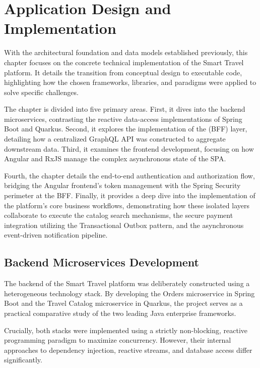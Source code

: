\chapter{Application Design and Implementation}
\label{sec:implementation}

With the architectural foundation and data models established previously, this chapter focuses on the concrete technical implementation of the Smart Travel platform. It details the transition from conceptual design to executable code, highlighting how the chosen frameworks, libraries, and paradigms were applied to solve specific challenges.

The chapter is divided into five primary areas. First, it dives into the backend microservices, contrasting the reactive data-access implementations of Spring Boot and Quarkus. Second, it explores the implementation of the (\gls{BFF}) layer, detailing how a centralized GraphQL API was constructed to aggregate downstream data. Third, it examines the frontend development, focusing on how Angular and RxJS manage the complex asynchronous state of the SPA.

Fourth, the chapter details the end-to-end authentication and authorization flow, bridging the Angular frontend's token management with the Spring Security perimeter at the BFF. Finally, it provides a deep dive into the implementation of the platform's core business workflows, demonstrating how these isolated layers collaborate to execute the catalog search mechanisms, the secure payment integration utilizing the Transactional Outbox pattern, and the asynchronous event-driven notification pipeline.


\section{Backend Microservices Development}
\label{sec:backend_microservices}

The backend of the Smart Travel platform was deliberately constructed using a heterogeneous technology stack. By developing the Orders microservice in Spring Boot and the Travel Catalog microservice in Quarkus, the project serves as a practical comparative study of the two leading Java enterprise frameworks. 

Crucially, both stacks were implemented using a strictly non-blocking, reactive programming paradigm to maximize concurrency. However, their internal approaches to dependency injection, reactive streams, and database access differ significantly.

